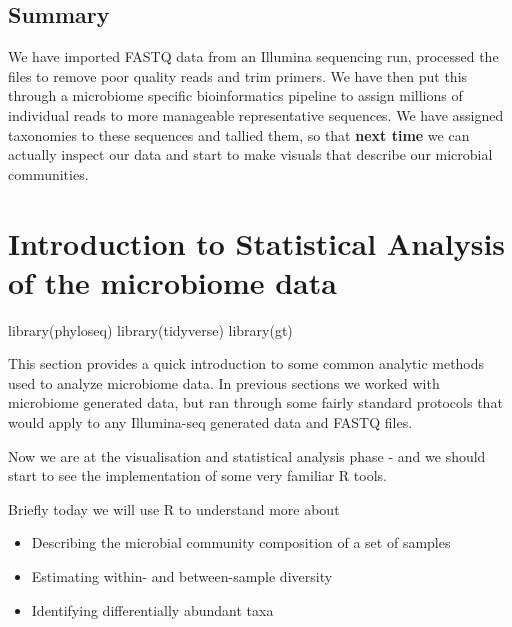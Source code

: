 \documentclass[
]{book}
\newenvironment{Shaded}{\begin{snugshade}}{\end{snugshade}}
\newcommand{\FunctionTok}[1]{\textcolor[rgb]{0.00,0.00,0.00}{#1}}
\newcommand{\NormalTok}[1]{#1}
\begin{document}
\hypertarget{summary-2}{%
\section{Summary}\label{summary-2}}

We have imported FASTQ data from an Illumina sequencing run, processed the files to remove poor quality reads and trim primers. We have then put this through a microbiome specific bioinformatics pipeline to assign millions of individual reads to more manageable representative sequences. We have assigned taxonomies to these sequences and tallied them, so that \textbf{next time} we can actually inspect our data and start to make visuals that describe our microbial communities.

\hypertarget{introduction-to-statistical-analysis-of-the-microbiome-data}{%
\chapter{Introduction to Statistical Analysis of the microbiome data}\label{introduction-to-statistical-analysis-of-the-microbiome-data}}

\begin{Shaded}
\begin{Highlighting}[]
\FunctionTok{library}\NormalTok{(phyloseq)}
\FunctionTok{library}\NormalTok{(tidyverse)}
\FunctionTok{library}\NormalTok{(gt)}
\end{Highlighting}
\end{Shaded}

This section provides a quick introduction to some common analytic methods used to analyze microbiome data.
In previous sections we worked with microbiome generated data, but ran through some fairly standard protocols that would apply to any Illumina-seq generated data and FASTQ files.

Now we are at the visualisation and statistical analysis phase - and we should start to see the implementation of some very familiar R tools.

Briefly today we will use R to understand more about

\begin{itemize}
\item
  Describing the microbial community composition of a set of samples
\item
  Estimating within- and between-sample diversity
\item
  Identifying differentially abundant taxa
\end{itemize}
\end{document}
